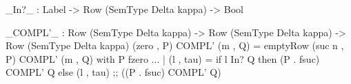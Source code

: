 \begin{agdaf}
_In?_ : Label -> Row (SemType Delta kappa) -> Bool

_COMPL'_ : Row (SemType Delta kappa) -> Row (SemType Delta kappa) -> 
       Row (SemType Delta kappa)
(zero , P) COMPL' (m , Q) = emptyRow
(suc n , P) COMPL' (m , Q) with P fzero
... | (l , tau) = if l In? Q then 
                  (P . fsuc) COMPL' Q else 
                  (l , tau) ;; ((P . fsuc) COMPL' Q) 
\end{agdaf}
